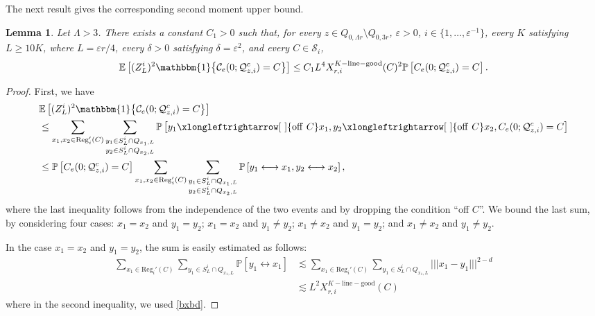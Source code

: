 \documentclass[11pt]{article}
\theoremstyle{definition}
\theoremstyle{remark}
\newcommand{\E}{\mathbb{E}}
\newcommand{\bP}{\mathbb{P}}
\numberwithin{equation}{section}
\theoremstyle{plain}
\newtheorem{lem}[theorem]{Lemma}
\theoremstyle{definition}
\theoremstyle{remark}
\theoremstyle{plain}
\newcommand{\ind}[1]{\mathbbm{1}\big\{#1\big\}}
\newcommand{\tnorm}[1]{\vert\!\vert\!\vert #1 \vert\!\vert\!\vert}
\begin{document}
The next result gives the corresponding second moment upper bound.

\begin{lem}\label{PZupperbd} Let $\Lambda >3$. There exists a constant $C_1>0$ such that, for every $z \in Q_{0,\Lambda r}\setminus Q_{0,3r}$, $\varepsilon>0$, $i\in\{1,\ldots,\varepsilon^{-1}\}$, every $K$ satisfying $L\ge 10K$, where $L=\varepsilon r/4$, every $\delta>0$ satisfying $\delta=\varepsilon^2$, and every $C\in\mathcal S_i$,
\begin{align*}
\E\left[(Z_{L}^i)^2\ind{ \mathcal C_e(0; \mathcal Q_{z, i}^c)=C}\right]\le C_1L^4X_{r,i}^{K-\mathrm{line-good}}(C)^2\bP\left[C_e(0; \mathcal Q_{z, i}^c)=C\right].
\end{align*}
\end{lem}
\begin{proof}
First, we have
\begin{align*}
    &\E\left[(Z_{L}^i)^2\ind{ \mathcal C_e(0; \mathcal Q_{z, i}^c)=C}\right]\\
    &\le \sum_{x_1,x_2 \in \mathrm{Reg}_i'(C)}\sum_{\substack{y_1\in S_L^i\cap Q_{x_1,L}\\ y_2\in S_L^i\cap Q_{x_2,L}}}\bP\left[y_1 \xlongleftrightarrow[~]{\mathrm{off}~C}x_1,y_2 \xlongleftrightarrow[~]{\mathrm{off}~C}x_2, C_e(0; \mathcal Q_{z, i}^c)=C \right]\\
    &\le \bP\left[C_e(0; \mathcal Q_{z, i}^c)=C \right]\sum_{x_1,x_2 \in \mathrm{Reg}_i'(C)}\sum_{\substack{y_1\in S_L^i\cap Q_{x_1,L}\\ y_2\in S_L^i\cap Q_{x_2,L}}}\bP\left[y_1 \longleftrightarrow x_1,y_2 \longleftrightarrow x_2\right],
\end{align*}
where the last inequality follows from the independence of the two events and by dropping the condition ``off $C$''. We bound the last sum, by considering four cases: $x_1=x_2$ and $y_1=y_2$; $x_1=x_2$ and $y_1\neq y_2$; $x_1\neq x_2$ and $y_1=y_2$; and $x_1\neq x_2$ and $y_1\neq y_2$.

In the case $x_1=x_2$ and $y_1=y_2$, the sum is easily estimated as follows:
\begin{align}
    \sum_{x_1\in \mathrm{Reg}_i'(C)}\sum_{y_1\in S_L^i\cap Q_{x_1,L}}\bP[y_1 \longleftrightarrow x_1]
    &\lesssim  \sum_{x_1\in \mathrm{Reg}_i'(C)}\sum_{y_1\in S_L^i\cap Q_{x_1,L}} \tnorm{x_1-y_1}^{2-d}\nonumber\\
    &\lesssim L^2X_{r,i}^{K-\mathrm{line-good}}(C) \label{easy}
\end{align}
where in the second inequality, we used \eqref{bxbd}.



\end{proof}
\end{document}
